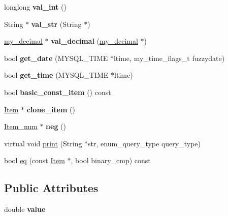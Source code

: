 \begin{DoxyCompactItemize}
longlong {\bfseries val\+\_\+int} ()
\item 
\mbox{\label{classItem__float_ad55646f9e80d02d19c01ffd3cdca6acc}} 
String $\ast$ {\bfseries val\+\_\+str} (String $\ast$)
\item 
\mbox{\label{classItem__float_a5ea4e30d308f03a487246d2480d9b10d}} 
\mbox{\hyperlink{classmy__decimal}{my\+\_\+decimal}} $\ast$ {\bfseries val\+\_\+decimal} (\mbox{\hyperlink{classmy__decimal}{my\+\_\+decimal}} $\ast$)
\item 
\mbox{\label{classItem__float_a1b6b6db0b2add7ab7960e1e9083aa0e9}} 
bool {\bfseries get\+\_\+date} (M\+Y\+S\+Q\+L\+\_\+\+T\+I\+ME $\ast$ltime, my\+\_\+time\+\_\+flags\+\_\+t fuzzydate)
\item 
\mbox{\label{classItem__float_a5f3e7bb4a1346bcaaff230a464dab907}} 
bool {\bfseries get\+\_\+time} (M\+Y\+S\+Q\+L\+\_\+\+T\+I\+ME $\ast$ltime)
\item 
\mbox{\label{classItem__float_a0020b07485ccc78ea3fe03994b21b160}} 
bool {\bfseries basic\+\_\+const\+\_\+item} () const
\item 
\mbox{\label{classItem__float_aaa071e62cfccae6531241cce05070c0f}} 
\mbox{\hyperlink{classItem}{Item}} $\ast$ {\bfseries clone\+\_\+item} ()
\item 
\mbox{\label{classItem__float_a78faabd13dcba970339da31f35167cbc}} 
\mbox{\hyperlink{classItem__num}{Item\+\_\+num}} $\ast$ {\bfseries neg} ()
\item 
virtual void \mbox{\hyperlink{classItem__float_a968cc4aafdeab156d234f92e5bcc2f9d}{print}} (String $\ast$str, enum\+\_\+query\+\_\+type query\+\_\+type)
\item 
bool \mbox{\hyperlink{classItem__float_a448efe19e2daa5e89d66b92b82ddbfba}{eq}} (const \mbox{\hyperlink{classItem}{Item}} $\ast$, bool binary\+\_\+cmp) const
\end{DoxyCompactItemize}
\subsection*{Public Attributes}
\begin{DoxyCompactItemize}
\item 
\mbox{\label{classItem__float_ac7347b6cc52c945a77fb99425f1e6120}} 
double {\bfseries value}
\end{DoxyCompactItemize}
